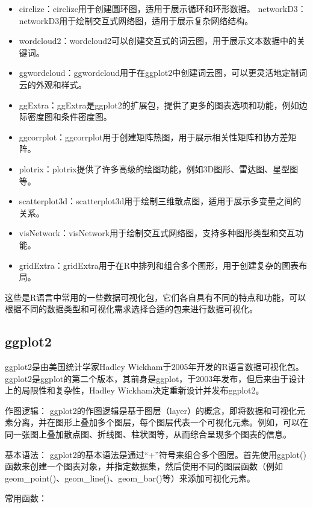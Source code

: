 \documentclass[]{book}
\begin{document}
\begin{itemize}
\item
  circlize：circlize用于创建圆环图，适用于展示循环和环形数据。
  networkD3：networkD3用于绘制交互式网络图，适用于展示复杂网络结构。
\item
  wordcloud2：wordcloud2可以创建交互式的词云图，用于展示文本数据中的关键词。
\item
  ggwordcloud：ggwordcloud用于在ggplot2中创建词云图，可以更灵活地定制词云的外观和样式。
\item
  ggExtra：ggExtra是ggplot2的扩展包，提供了更多的图表选项和功能，例如边际密度图和条件密度图。
\item
  ggcorrplot：ggcorrplot用于创建矩阵热图，用于展示相关性矩阵和协方差矩阵。
\item
  plotrix：plotrix提供了许多高级的绘图功能，例如3D图形、雷达图、星型图等。
\item
  scatterplot3d：scatterplot3d用于绘制三维散点图，适用于展示多变量之间的关系。
\item
  visNetwork：visNetwork用于绘制交互式网络图，支持多种图形类型和交互功能。
\item
  gridExtra：gridExtra用于在R中排列和组合多个图形，用于创建复杂的图表布局。
\end{itemize}

这些是R语言中常用的一些数据可视化包，它们各自具有不同的特点和功能，可以根据不同的数据类型和可视化需求选择合适的包来进行数据可视化。

\hypertarget{ggplot2}{%
\subsection{ggplot2}\label{ggplot2}}

ggplot2是由美国统计学家Hadley Wickham于2005年开发的R语言数据可视化包。ggplot2是ggplot的第二个版本，其前身是ggplot，于2003年发布，但后来由于设计上的局限性和复杂性，Hadley Wickham决定重新设计并发布ggplot2。

作图逻辑：
ggplot2的作图逻辑是基于图层（layer）的概念，即将数据和可视化元素分离，并在图形上叠加多个图层，每个图层代表一个可视化元素。例如，可以在同一张图上叠加散点图、折线图、柱状图等，从而综合呈现多个图表的信息。

基本语法：
ggplot2的基本语法是通过``+''符号来组合多个图层。首先使用ggplot()函数来创建一个图表对象，并指定数据集，然后使用不同的图层函数（例如geom\_point()、geom\_line()、geom\_bar()等）来添加可视化元素。

常用函数：
\end{document}
